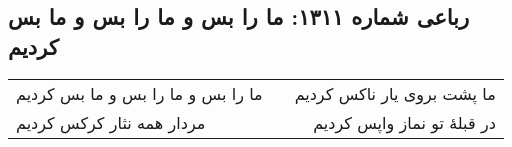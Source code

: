 \begin{center}
\section*{رباعی شماره ۱۳۱۱: ما را بس و ما را بس و ما بس کردیم}
\label{sec:1311}
\begin{longtable}{l p{0.5cm} r}
ما را بس و ما را بس و ما بس کردیم
&&
ما پشت بروی یار ناکس کردیم
\\
مردار همه نثار کرکس کردیم
&&
در قبلهٔ تو نماز واپس کردیم
\\
\end{longtable}
\end{center}
